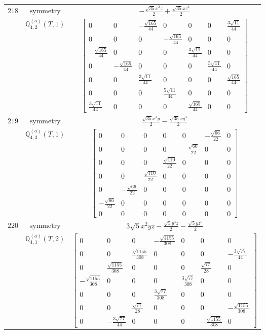 \documentclass[fleqn,8pt,landscape]{jsarticle}
\begin{document}
\begin{longtable}{ccc}
$ 218 $ & $ \text{symmetry} $ & $ - \frac{\sqrt{35} x^{3} z}{2} + \frac{\sqrt{35} x z^{3}}{2} $ \\
$  $ & $ \mathbb{Q}_{4,2}^{(a)}(T,1) $ & $ \begin{bmatrix} 0 & 0 & - \frac{\sqrt{165}}{44} & 0 & 0 & 0 & \frac{3 \sqrt{11}}{44} \\ 0 & 0 & 0 & - \frac{\sqrt{165}}{44} & 0 & 0 & 0 \\ - \frac{\sqrt{165}}{44} & 0 & 0 & 0 & \frac{3 \sqrt{11}}{44} & 0 & 0 \\ 0 & - \frac{\sqrt{165}}{44} & 0 & 0 & 0 & \frac{5 \sqrt{11}}{44} & 0 \\ 0 & 0 & \frac{3 \sqrt{11}}{44} & 0 & 0 & 0 & \frac{\sqrt{165}}{44} \\ 0 & 0 & 0 & \frac{5 \sqrt{11}}{44} & 0 & 0 & 0 \\ \frac{3 \sqrt{11}}{44} & 0 & 0 & 0 & \frac{\sqrt{165}}{44} & 0 & 0 \end{bmatrix} $ \\ \hline
$ 219 $ & $ \text{symmetry} $ & $ \frac{\sqrt{35} x^{3} y}{2} - \frac{\sqrt{35} x y^{3}}{2} $ \\
$  $ & $ \mathbb{Q}_{4,3}^{(a)}(T,1) $ & $ \begin{bmatrix} 0 & 0 & 0 & 0 & 0 & - \frac{\sqrt{66}}{22} & 0 \\ 0 & 0 & 0 & 0 & - \frac{\sqrt{66}}{22} & 0 & 0 \\ 0 & 0 & 0 & \frac{\sqrt{110}}{22} & 0 & 0 & 0 \\ 0 & 0 & \frac{\sqrt{110}}{22} & 0 & 0 & 0 & 0 \\ 0 & - \frac{\sqrt{66}}{22} & 0 & 0 & 0 & 0 & 0 \\ - \frac{\sqrt{66}}{22} & 0 & 0 & 0 & 0 & 0 & 0 \\ 0 & 0 & 0 & 0 & 0 & 0 & 0 \end{bmatrix} $ \\ \hline
$ 220 $ & $ \text{symmetry} $ & $ 3 \sqrt{5} x^{2} y z - \frac{\sqrt{5} y^{3} z}{2} - \frac{\sqrt{5} y z^{3}}{2} $ \\
$  $ & $ \mathbb{Q}_{4,1}^{(a)}(T,2) $ & $ \begin{bmatrix} 0 & 0 & 0 & - \frac{\sqrt{1155}}{308} & 0 & 0 & 0 \\ 0 & 0 & \frac{\sqrt{1155}}{308} & 0 & 0 & 0 & - \frac{3 \sqrt{77}}{44} \\ 0 & \frac{\sqrt{1155}}{308} & 0 & 0 & 0 & \frac{\sqrt{77}}{28} & 0 \\ - \frac{\sqrt{1155}}{308} & 0 & 0 & 0 & \frac{3 \sqrt{77}}{308} & 0 & 0 \\ 0 & 0 & 0 & \frac{3 \sqrt{77}}{308} & 0 & 0 & 0 \\ 0 & 0 & \frac{\sqrt{77}}{28} & 0 & 0 & 0 & - \frac{\sqrt{1155}}{308} \\ 0 & - \frac{3 \sqrt{77}}{44} & 0 & 0 & 0 & - \frac{\sqrt{1155}}{308} & 0 \end{bmatrix} $ \\ \hline

\end{longtable}
\end{document}
